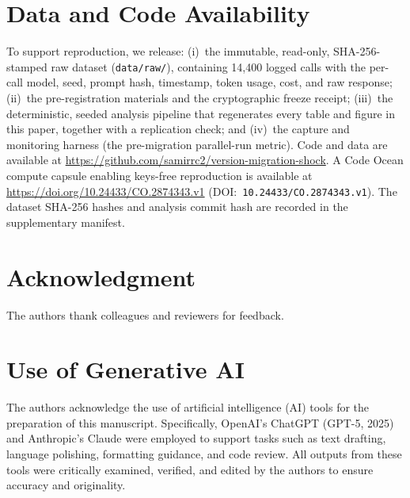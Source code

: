 \documentclass[11pt]{article}
\begin{document}
\section*{Data and Code Availability}
To support reproduction, we release: (i)~the immutable, read-only,
SHA-256-stamped raw dataset (\texttt{data/raw/}), containing 14{,}400 logged
calls with the per-call model, seed, prompt hash, timestamp, token usage, cost,
and raw response; (ii)~the pre-registration materials and the cryptographic
freeze receipt; (iii)~the deterministic, seeded analysis pipeline that
regenerates every table and figure in this paper, together with a replication
check; and (iv)~the capture and monitoring harness (the pre-migration
parallel-run metric). Code and data are available at
\url{https://github.com/samirrc2/version-migration-shock}.
A Code Ocean compute capsule enabling keys-free reproduction is available at
\url{https://doi.org/10.24433/CO.2874343.v1}
(DOI:~\texttt{10.24433/CO.2874343.v1}).
The dataset SHA-256 hashes and analysis commit hash are recorded in the
supplementary manifest.

\section*{Acknowledgment}
The authors thank colleagues and reviewers for feedback.

\section*{Use of Generative AI}
The authors acknowledge the use of artificial intelligence (AI) tools for the
preparation of this manuscript. Specifically, OpenAI's ChatGPT (GPT-5, 2025)
and Anthropic's Claude were employed to support tasks such as text drafting,
language polishing, formatting guidance, and code review. All outputs from
these tools were critically examined, verified, and edited by the authors to
ensure accuracy and originality.
\end{document}
